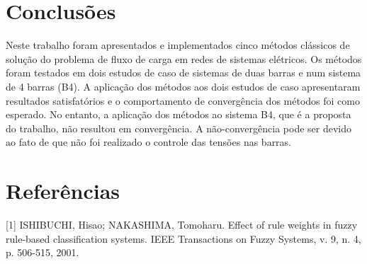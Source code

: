 \documentclass[12pt,a4paper]{article}
\numberwithin{equation}{section}
\begin{document}
\newpage
\section{Conclusões}

Neste trabalho foram apresentados e implementados cinco métodos clássicos de solução
do problema de fluxo de carga em redes de sistemas elétricos.
Os métodos foram testados em dois estudos de caso de sistemas de duas barras e num sistema
de 4 barras (B4).
A aplicação dos métodos aos dois estudos de caso apresentaram resultados satisfatórios
e o comportamento de convergência dos métodos foi como esperado. 
No entanto, a aplicação dos métodos ao sistema B4, que é a proposta do trabalho, não 
resultou em convergência. A não-convergência pode ser devido ao fato de que não foi
realizado o controle das tensões nas barras. 

\newpage

\section*{Referências}
%

[1] ISHIBUCHI, Hisao; NAKASHIMA, Tomoharu. Effect of rule weights in fuzzy rule-based classification systems. IEEE Transactions on Fuzzy Systems, v. 9, n. 4, p. 506-515, 2001.
\end{document}
